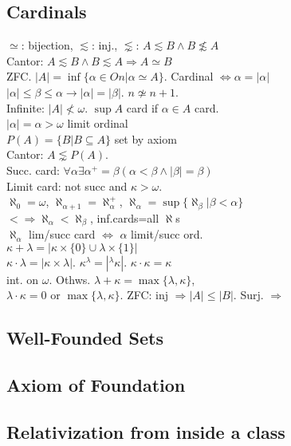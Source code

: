 \documentclass[twocolumn]{article}
\begin{document}
\subsection*{Cardinals}
$\simeq$: bijection, $\lesssim$: inj., $\lnsim$: $A\lesssim B\wedge B\not\lesssim A$\\
Cantor: $A\lesssim B\wedge B\lesssim A\Rightarrow A\simeq B$\\
ZFC. $|A|=\inf\{\alpha\in On|\alpha\simeq A\}$. Cardinal $\Leftrightarrow \alpha=|\alpha|$\\
$|\alpha|\leqslant \beta\leqslant \alpha\rightarrow |\alpha|=|\beta|$. $n\not\simeq n+1$.\\
Infinite: $|A|\not<\omega$. $\sup A$ card if $\alpha\in A$ card.\\
$|\alpha|=\alpha>\omega$ limit ordinal\\
$P(A)=\{B|B\subseteq A\}$ set by axiom\\
Cantor: $A\lnsim P(A)$.\\
Succ. card: $\forall\alpha\exists\alpha^+=\beta(\alpha<\beta\wedge|\beta|=\beta)$\\
Limit card: not succ and $\kappa>\omega$.\\
$\aleph_0=\omega$, $\aleph_{\alpha+1}=\aleph_{\alpha}^+$, $\aleph_\alpha=\sup\{\aleph_{\beta}|\beta<\alpha\}$\\
$<\Rightarrow\aleph_\alpha<\aleph_\beta$, inf.cards=all $\aleph$s\\
$\aleph_\alpha$ lim/succ card $\Leftrightarrow$ $\alpha$ limit/succ ord.\\
$\kappa+\lambda=|\kappa\times\{0\}\cup\lambda\times\{1\}|$\\
$\kappa\cdot\lambda=|\kappa\times\lambda|$. $\kappa^\lambda=|^\lambda\kappa|$. $\kappa\cdot\kappa=\kappa$\\
int. on $\omega$. Othws. $\lambda+\kappa=\max\{\lambda,\kappa\}$,\\
$\lambda\cdot \kappa=0$ or $\max\{\lambda,\kappa\}$.
ZFC: inj $\Rightarrow |A|\leqslant |B|$. Surj. $\Rightarrow$

\subsection*{Well-Founded Sets}
\subsection*{Axiom of Foundation}
\subsection*{Relativization from inside a class}
\end{document}
